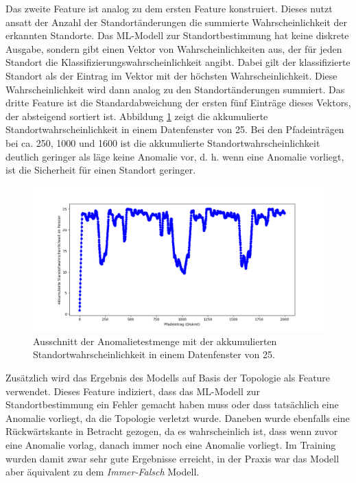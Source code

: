 \newline
\newline
Das zweite Feature ist analog zu dem ersten Feature konstruiert.
Dieses nutzt ansatt der Anzahl der Standortänderungen die summierte Wahrscheinlichkeit der erkannten Standorte.
Das ML-Modell zur Standortbestimmung hat keine diskrete Ausgabe, sondern gibt einen Vektor von Wahrscheinlichkeiten aus,
der für jeden Standort die Klassifizierungswahrscheinlichkeit angibt.
Dabei gilt der klassifizierte Standort als der Eintrag im Vektor mit der höchsten Wahrscheinlichkeit.
Diese Wahrscheinlichkeit wird dann analog zu den Standortänderungen summiert.
Das dritte Feature ist die Standardabweichung der ersten fünf Einträge dieses Vektors, der absteigend sortiert ist.
Abbildung \ref{fig:window_confidence} zeigt die akkumulierte Standortwahrscheinlichkeit in einem Datenfenster von 25.
Bei den Pfadeinträgen bei ca. 250, 1000 und 1600 ist die akkumulierte Standortwahrscheinlichkeit deutlich geringer als läge keine Anomalie vor,
d. h. wenn eine Anomalie vorliegt, ist die Sicherheit für einen Standort geringer.
\begin{figure}[h!]
    \centering
    \includegraphics[width=\linewidth]{images/feature_window_confidence.png}
    \caption{Ausschnitt der Anomalietestmenge mit der akkumulierten Standortwahrscheinlichkeit in einem Datenfenster von 25.}
    \label{fig:window_confidence}
\end{figure}
\newline
\newline
Zusätzlich wird das Ergebnis des Modells auf Basis der Topologie als Feature verwendet.
Dieses Feature indiziert, dass das ML-Modell zur Standortbestimmung ein Fehler gemacht haben muss
oder dass tatsächlich eine Anomalie vorliegt, da die Topologie verletzt wurde.
\newline
\newline
Daneben wurde ebenfalls eine Rückwärtskante in Betracht gezogen,
da es wahrscheinlich ist, dass wenn zuvor eine Anomalie vorlag, danach immer noch eine Anomalie vorliegt.
Im Training wurden damit zwar sehr gute Ergebnisse erreicht,
in der Praxis war das Modell aber äquivalent zu dem \textit{Immer-Falsch} Modell.
